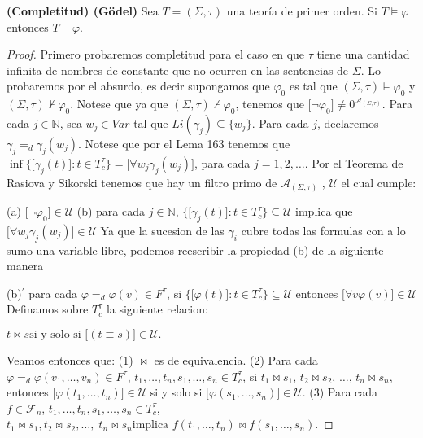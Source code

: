   \begin{theorem} \label{theorem_82}
    \PN \textbf{(Completitud) (G{\"o}del)} Sea $T = (\Sigma, \tau)$ una teoría de primer orden. Si $T \models \varphi$
    entonces $T \vdash \varphi$.
  \end{theorem}
  \begin{proof} %
    Primero probaremos completitud para el caso en que $\tau $ tiene una cantidad infinita de nombres de constante que no ocurren en las sentencias de $ \Sigma $. Lo probaremos por el absurdo, es decir supongamos que $\varphi_{0} $ es tal que $(\Sigma, \tau)\models \varphi_{0}$ y $(\Sigma, \tau)\not\vdash \varphi_{0}.$ Notese que ya que $(\Sigma, \tau)\not\vdash \varphi_{0}$, tenemos que $\lbrack\lnot \varphi_{0}\rbrack\not=0^{\mathcal{A}_{(\Sigma, \tau)}}.$ Para cada $j\in \mathbb{N}$, sea $w_{j}\in Var$ tal que $ Li(\gamma _{j})\subseteq \{w_{j}\}$. Para cada $j$, declaremos $\gamma _{j}=_{d}\gamma _{j}(w_{j})$. Notese que por el Lema 163 tenemos que $\inf \{\lbrack\gamma _{j}(t)\rbrack:t\in T_{c}^{\tau }\} = \lbrack\forall w_{j}\gamma _{j}(w_{j})\rbrack$, para cada $j=1,2,\dotsc$. Por el Teorema de Rasiova y Sikorski tenemos que hay un filtro primo de $\mathcal{A}_{(\Sigma, \tau)}$ , $\mathcal{U}$ el cual cumple:

    (a) $\lbrack\lnot \varphi_{0}\rbrack\in \mathcal{U}$
    (b) para cada $j\in \mathbb{N}$, $\{\lbrack\gamma _{j}(t)\rbrack:t\in T_{c}^{\tau }\}\subseteq \mathcal{U}$ implica que $\lbrack\forall w_{j}\gamma _{j}(w_{j})\rbrack\in \mathcal{U}$
    Ya que la sucesion de las $\gamma _{i}$ cubre todas las formulas con a lo sumo una variable libre, podemos reescribir la propiedad (b) de la siguiente manera

    (b)$^{\prime}$ para cada $\varphi =_{d}\varphi (v) \in F^{\tau }$, si $\{\lbrack\varphi (t)\rbrack:t\in T_{c}^{\tau }\}\subseteq \mathcal{U}$ entonces $ \lbrack\forall v\varphi (v)\rbrack\in \mathcal{U}$
    Definamos sobre $T_{c}^{\tau }$ la siguiente relacion:

    $\displaystyle t\bowtie s\text{si y solo si }\lbrack(t\equiv s)\rbrack\in \mathcal{U}\text{.} $

    Veamos entonces que:
    (1) $\bowtie $ es de equivalencia.
    (2) Para cada $\varphi =_{d}\varphi (v_{1}, \dotsc, v_{n}) \in F^{\tau }$, $ t_{1}, \dotsc, t_{n},s_{1}, \dotsc, s_{n}\in T_{c}^{\tau }$, si $t_{1}\bowtie s_{1}$, $ t_{2}\bowtie s_{2}$, $\dotsc$, $t_{n}\bowtie s_{n}$, entonces $\lbrack\varphi (t_{1}, \dotsc, t_{n})\rbrack\in \mathcal{U}$ si y solo si $\lbrack\varphi (s_{1}, \dotsc, s_{n})\rbrack\in \mathcal{U}$.
    (3) Para cada $f\in \mathcal{F}_{n}$, $ t_{1}, \dotsc, t_{n},s_{1}, \dotsc, s_{n}\in T_{c}^{\tau }$,
    $\displaystyle t_{1}\bowtie s_{1},t_{2}\bowtie s_{2}, \dotsc, \;t_{n}\bowtie s_{n}\text{implica }f(t_{1}, \dotsc, t_{n})\bowtie f(s_{1}, \dotsc, s_{n}). $


\end{proof}
